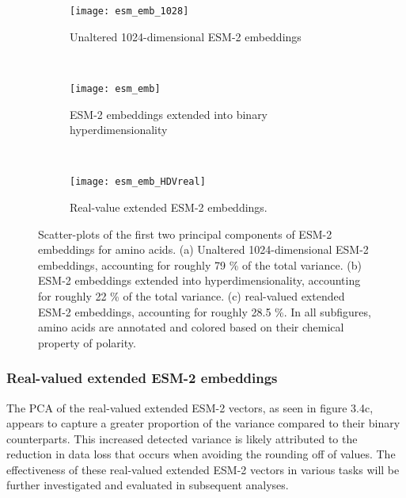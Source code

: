 \begin{figure}[H]
\centering
\begin{minipage}[b]{.5\textwidth}
    \begin{subfigure}[b]{\textwidth}
    \texttt{[image: esm\_emb\_1028]}
    \caption{Unaltered 1024-dimensional ESM-2 embeddings}
    \label{fig:AAesm_pure}
\end{subfigure}
\end{minipage}
\\
\centering
\begin{minipage}[b]{.5\textwidth}
\begin{subfigure}[b]{\textwidth}
    \texttt{[image: esm\_emb]}
    \caption{ESM-2 embeddings extended into binary hyperdimensionality}
    \label{fig:AAesm}
\end{subfigure}
\end{minipage}
\\
\centering
\begin{minipage}[b]{.5\textwidth}
\begin{subfigure}[b]{\textwidth}
    \texttt{[image: esm\_emb\_HDVreal]}
    \caption{Real-value extended ESM-2 embeddings.}
    \label{fig:AAesmreal}
\end{subfigure}
\end{minipage}
\caption{Scatter-plots of the first two principal components of ESM-2 embeddings for amino acids. (a) Unaltered 1024-dimensional ESM-2 embeddings, accounting for roughly 79 \% of the total variance. (b) ESM-2 embeddings extended into hyperdimensionality, accounting for roughly 22 \% of the total variance. (c) real-valued extended ESM-2 embeddings, accounting for roughly 28.5 \%. In all subfigures, amino acids are annotated and colored based on their chemical property of polarity.}
\label{fig:combined_ESM_embeddings}
\end{figure}

\subsubsection*{Real-valued extended ESM-2 embeddings}
The PCA of the real-valued extended ESM-2 vectors, as seen in figure 3.4c, appears to capture a greater proportion of the variance compared to their binary counterparts. This increased detected variance is likely attributed to the reduction in data loss that occurs when avoiding the rounding off of values. The effectiveness of these real-valued extended ESM-2 vectors in various tasks will be further investigated and evaluated in subsequent analyses.

